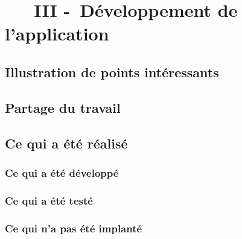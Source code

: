 \chapter[~~~DÉVELOPPEMENT DE L'APPLICATION]{~~~III -~Développement de l’application}%
\label{refDev3}%

\section{Illustration de points intéressants}
\section{Partage du travail}
\section{Ce qui a été réalisé}

\subsection{Ce qui a été développé}
\subsection{Ce qui a été testé}
\subsection{Ce qui n'a pas été implanté}
